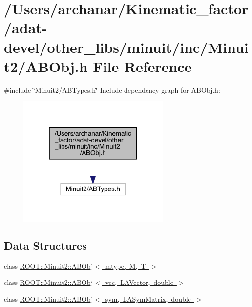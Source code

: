 \hypertarget{adat-devel_2other__libs_2minuit_2inc_2Minuit2_2ABObj_8h}{}\section{/\+Users/archanar/\+Kinematic\+\_\+factor/adat-\/devel/other\+\_\+libs/minuit/inc/\+Minuit2/\+A\+B\+Obj.h File Reference}
\label{adat-devel_2other__libs_2minuit_2inc_2Minuit2_2ABObj_8h}
{\ttfamily \#include \char`\"{}Minuit2/\+A\+B\+Types.\+h\char`\"{}}\newline
Include dependency graph for A\+B\+Obj.\+h\+:
\nopagebreak
\begin{figure}[H]
\begin{center}
\leavevmode
\includegraphics[width=214pt]{d5/da6/adat-devel_2other__libs_2minuit_2inc_2Minuit2_2ABObj_8h__incl}
\end{center}
\end{figure}
\subsection*{Data Structures}
\begin{DoxyCompactItemize}
\item 
class \mbox{\hyperlink{classROOT_1_1Minuit2_1_1ABObj}{R\+O\+O\+T\+::\+Minuit2\+::\+A\+B\+Obj$<$ mtype, M, T $>$}}
\item 
class \mbox{\hyperlink{classROOT_1_1Minuit2_1_1ABObj_3_01vec_00_01LAVector_00_01double_01_4}{R\+O\+O\+T\+::\+Minuit2\+::\+A\+B\+Obj$<$ vec, L\+A\+Vector, double $>$}}
\item 
class \mbox{\hyperlink{classROOT_1_1Minuit2_1_1ABObj_3_01sym_00_01LASymMatrix_00_01double_01_4}{R\+O\+O\+T\+::\+Minuit2\+::\+A\+B\+Obj$<$ sym, L\+A\+Sym\+Matrix, double $>$}}
\end{DoxyCompactItemize}
